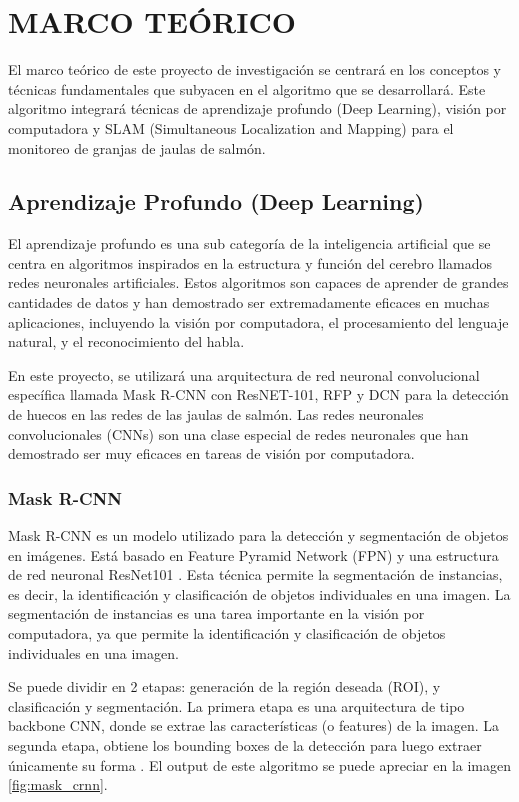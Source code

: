 \chapter{MARCO TEÓRICO}

El marco teórico de este proyecto de investigación se centrará en los conceptos y técnicas fundamentales que subyacen en el algoritmo que se desarrollará. Este algoritmo integrará técnicas de aprendizaje profundo (Deep Learning), visión por computadora y SLAM (Simultaneous Localization and Mapping) para el monitoreo de granjas de jaulas de salmón.

\section{Aprendizaje Profundo (Deep Learning)}

El aprendizaje profundo es una sub categoría de la inteligencia artificial que se centra en algoritmos inspirados en la estructura y función del cerebro llamados redes neuronales artificiales. Estos algoritmos son capaces de aprender de grandes cantidades de datos y han demostrado ser extremadamente eficaces en muchas aplicaciones, incluyendo la visión por computadora, el procesamiento del lenguaje natural, y el reconocimiento del habla.

En este proyecto, se utilizará una arquitectura de red neuronal convolucional específica llamada Mask R-CNN con ResNET-101, RFP y DCN para la detección de huecos en las redes de las jaulas de salmón. Las redes neuronales convolucionales (CNNs) son una clase especial de redes neuronales que han demostrado ser muy eficaces en tareas de visión por computadora. 

\subsection{Mask R-CNN}

Mask R-CNN es un modelo utilizado para la detección y segmentación de objetos en imágenes. Está basado en Feature Pyramid Network (FPN) y una estructura de red neuronal ResNet101 \cite{matterport_maskrcnn_2017}. Esta técnica permite la segmentación de instancias, es decir, la identificación y clasificación de objetos individuales en una imagen. La segmentación de instancias es una tarea importante en la visión por computadora, ya que permite la identificación y clasificación de objetos individuales en una imagen. 


Se puede dividir en 2 etapas: generación de la región deseada (ROI), y clasificación y segmentación. La primera etapa es una arquitectura de tipo backbone CNN, donde se extrae las características (o features) de la imagen. La segunda etapa, obtiene los bounding boxes de la detección para luego extraer únicamente su forma \cite{cite:Zhang}. El output de este algoritmo se puede apreciar en la imagen \ref{fig:mask_crnn}.


